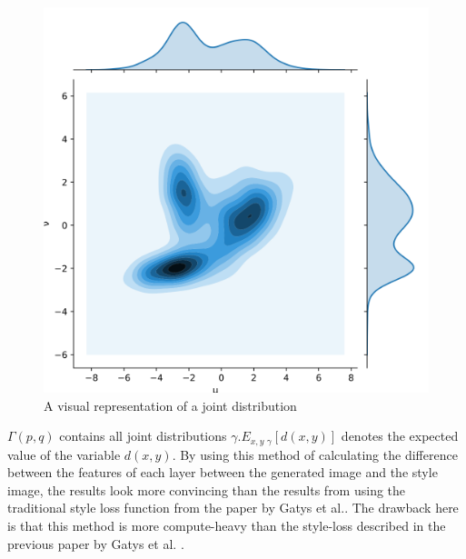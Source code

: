 \begin{figure}[!ht]
\begin{center}
\includegraphics[scale=0.30]{report/Background/images/1024px-Transport-plan.svg.png}
\caption{A visual representation of a joint distribution}
\label{fig:featuremap}
\end{center}
\end{figure}
$\Gamma(p, q)$ contains all joint distributions $\gamma$.$ E_{x, y \text{~}\gamma}[d(x, y)]$ denotes the expected value of the variable $d(x, y)$.
\newline
By using this method of calculating the difference between the features of each layer between the generated image and the style image, the results look more convincing than the results from using the traditional style loss function from the paper by Gatys et al.\cite{Gatys:1}.\newline\newline
The drawback here is that this method is more compute-heavy than the style-loss described in the previous paper by Gatys et al. \cite{Gatys:1}.